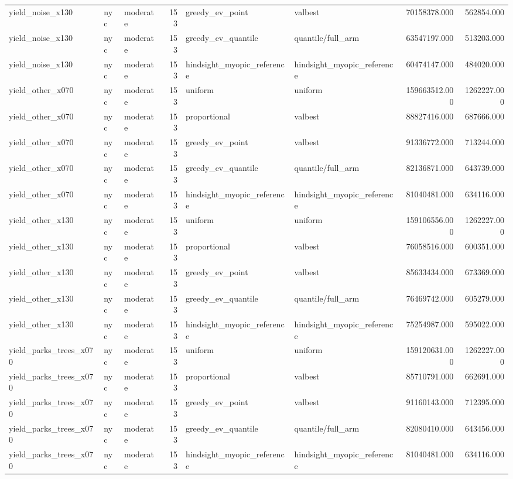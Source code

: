 \begin{tabular}{lllrllrr}
yield\_noise\_x130 & nyc & moderate & 153 & greedy\_ev\_point & valbest & 70158378.000 & 562854.000 \\
yield\_noise\_x130 & nyc & moderate & 153 & greedy\_ev\_quantile & quantile/full\_arm & 63547197.000 & 513203.000 \\
yield\_noise\_x130 & nyc & moderate & 153 & hindsight\_myopic\_reference & hindsight\_myopic\_reference & 60474147.000 & 484020.000 \\
yield\_other\_x070 & nyc & moderate & 153 & uniform & uniform & 159663512.000 & 1262227.000 \\
yield\_other\_x070 & nyc & moderate & 153 & proportional & valbest & 88827416.000 & 687666.000 \\
yield\_other\_x070 & nyc & moderate & 153 & greedy\_ev\_point & valbest & 91336772.000 & 713244.000 \\
yield\_other\_x070 & nyc & moderate & 153 & greedy\_ev\_quantile & quantile/full\_arm & 82136871.000 & 643739.000 \\
yield\_other\_x070 & nyc & moderate & 153 & hindsight\_myopic\_reference & hindsight\_myopic\_reference & 81040481.000 & 634116.000 \\
yield\_other\_x130 & nyc & moderate & 153 & uniform & uniform & 159106556.000 & 1262227.000 \\
yield\_other\_x130 & nyc & moderate & 153 & proportional & valbest & 76058516.000 & 600351.000 \\
yield\_other\_x130 & nyc & moderate & 153 & greedy\_ev\_point & valbest & 85633434.000 & 673369.000 \\
yield\_other\_x130 & nyc & moderate & 153 & greedy\_ev\_quantile & quantile/full\_arm & 76469742.000 & 605279.000 \\
yield\_other\_x130 & nyc & moderate & 153 & hindsight\_myopic\_reference & hindsight\_myopic\_reference & 75254987.000 & 595022.000 \\
yield\_parks\_trees\_x070 & nyc & moderate & 153 & uniform & uniform & 159120631.000 & 1262227.000 \\
yield\_parks\_trees\_x070 & nyc & moderate & 153 & proportional & valbest & 85710791.000 & 662691.000 \\
yield\_parks\_trees\_x070 & nyc & moderate & 153 & greedy\_ev\_point & valbest & 91160143.000 & 712395.000 \\
yield\_parks\_trees\_x070 & nyc & moderate & 153 & greedy\_ev\_quantile & quantile/full\_arm & 82080410.000 & 643456.000 \\
yield\_parks\_trees\_x070 & nyc & moderate & 153 & hindsight\_myopic\_reference & hindsight\_myopic\_reference & 81040481.000 & 634116.000 \\

\end{tabular}
